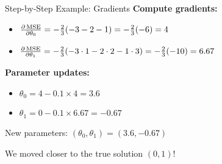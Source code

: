 \documentclass[usenames,dvipsnames]{beamer}
\begin{document}
  \begin{frame}{Step-by-Step Example: Gradients}
    \textbf{Compute gradients:}
    \begin{itemize}[<+->]
        \item $\frac{\partial \operatorname{MSE}}{\partial \theta_0} = -\frac{2}{3}(-3-2-1) = -\frac{2}{3}(-6) = 4$
        \item $\frac{\partial \operatorname{MSE}}{\partial \theta_1} = -\frac{2}{3}(-3 \cdot 1 - 2 \cdot 2 - 1 \cdot 3) = -\frac{2}{3}(-10) = 6.67$
    \end{itemize}
    
    \pause
    \textbf{Parameter updates:}
    \begin{itemize}[<+->]
        \item $\theta_0 = 4 - 0.1 \times 4 = 3.6$
        \item $\theta_1 = 0 - 0.1 \times 6.67 = -0.67$
    \end{itemize}
    
    \pause
    \begin{keypointsbox}{}
    New parameters: $(\theta_0, \theta_1) = (3.6, -0.67)$
    
    We moved closer to the true solution $(0, 1)$!
    \end{keypointsbox}
  \end{frame}
\end{document}

